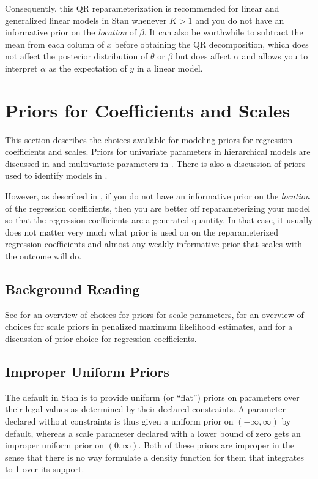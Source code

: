 %
Consequently, this QR reparameterization is recommended for linear and
generalized linear models in Stan whenever $K > 1$ and you do not have
an informative prior on the \emph{location} of $\beta$. It can also be
worthwhile to subtract the mean from each column of $x$ before
obtaining the QR decomposition, which does not affect the posterior
distribution of $\theta$ or $\beta$ but does affect $\alpha$ and
allows you to interpret $\alpha$ as the expectation of $y$ in a linear
model.

\section{Priors for Coefficients and Scales}\label{regression-priors.section}

This section describes the choices available for modeling priors for
regression coefficients and scales.  Priors for univariate parameters
in hierarchical models are discussed in
 and multivariate parameters in
. There is also a
discussion of priors used to identify models in
. 

However, as described in , if you do 
not have an informative prior on the \emph{location} of the regression 
coefficients, then you are better off reparameterizing your model so 
that the regression coefficients are a generated quantity. In that case,
it usually does not matter very much what prior is used on on the
reparameterized regression coefficients and almost any weakly informative
prior that scales with the outcome will do.

\subsection{Background Reading}

See \citep{Gelman:2006} for an overview of choices for priors for
scale parameters, \citep{ChungEtAl:2013} for an overview of choices
for scale priors in penalized maximum likelihood estimates, and
\cite{GelmanJakulinPittauEtAl:2008} for a discussion of prior choice
for regression coefficients.

\subsection{Improper Uniform Priors}

The default in Stan is to provide uniform (or ``flat'') priors on
parameters over their legal values as determined by their declared
constraints.  A parameter declared without constraints is thus given a
uniform prior on $(-\infty,\infty)$ by default, whereas a scale
parameter declared with a lower bound of zero gets an improper uniform
prior on $(0,\infty)$.  Both of these priors are improper in the sense
that there is no way formulate a density function for them that
integrates to 1 over its support.


